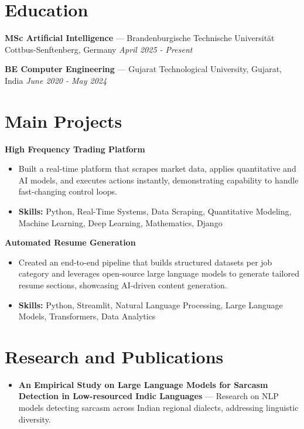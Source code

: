 \documentclass[a4paper,10pt]{article}
\begin{document}
\section*{Education}
\textbf{MSc Artificial Intelligence} — Brandenburgische Technische Universität Cottbus-Senftenberg, Germany \hfill \textit{April 2025 - Present}\par
\vspace{1.5pt}
\textbf{BE Computer Engineering} — Gujarat Technological University, Gujarat, India \hfill \textit{June 2020 - May 2024}\par

\section*{Main Projects}
\textbf{High Frequency Trading Platform}\par
\vspace{1pt}
\begin{itemize}
  \item Built a real-time platform that scrapes market data, applies quantitative and AI models, and executes actions instantly, demonstrating capability to handle fast-changing control loops.
  \item \textbf{Skills:} Python, Real-Time Systems, Data Scraping, Quantitative Modeling, Machine Learning, Deep Learning, Mathematics, Django
\end{itemize}
\vspace{3pt}
\textbf{Automated Resume Generation}\par
\vspace{1pt}
\begin{itemize}
  \item Created an end-to-end pipeline that builds structured datasets per job category and leverages open-source large language models to generate tailored resume sections, showcasing AI-driven content generation.
  \item \textbf{Skills:} Python, Streamlit, Natural Language Processing, Large Language Models, Transformers, Data Analytics
\end{itemize}

\section*{Research and Publications}
\begin{itemize}
\item \textbf{An Empirical Study on Large Language Models for Sarcasm Detection in Low-resourced Indic Languages} — Research on NLP models detecting sarcasm across Indian regional dialects, addressing linguistic diversity.
\end{itemize}
\end{document}
